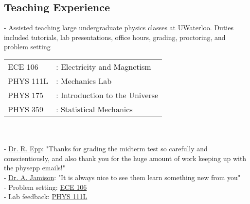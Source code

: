 \documentclass[margin,line]{res}
\begin{document}
\begin{resume}
\section{\sc Teaching Experience}
- Assisted teaching large undergraduate physics classes at UWaterloo. Duties included tutorials, lab presentations, office hours, grading, proctoring, and problem setting\\
\begin{tabular}{ll}
    \textsf{ECE 106} & : Electricity and Magnetism \\
    \textsf{PHYS 111L} & : Mechanics Lab \\
    \textsf{PHYS 175} & : Introduction to the Universe \\
    \textsf{PHYS 359} & : Statistical Mechanics 
\end{tabular}\\\\
- \href{https://uwaterloo.ca/astrophysics-centre/people-profiles/richard-epp}{\sffamily Dr. R. Epp}: "Thanks for grading the midterm test so carefully and conscientiously, and also thank you for the huge amount of work keeping up with the physepp emails!"\\
- \href{https://uwaterloo.ca/physics-astronomy/profile/alanj}{\sffamily Dr. A. Jamison}: "It is always nice to see them learn something new from you"\\
- Problem setting: \href{https://sriramgkn.github.io/docs/ECE106_Problems.pdf}{\sffamily ECE 106}\\
- Lab feedback: \href{https://sriramgkn.github.io/docs/phys111L_feedback2.pdf}{\sffamily PHYS 111L}






\end{resume}
\end{document}
